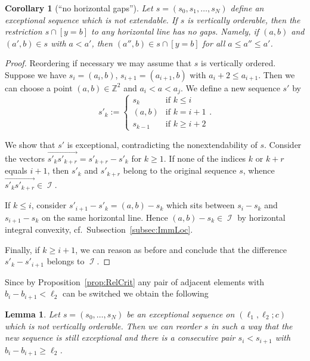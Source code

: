 \documentclass[11pt]{article}
\newtheorem{lemma}[theo]{Lemma}
\newtheorem{coro}[theo]{Corollary}
\theoremstyle{definition}
\numberwithin{equation}{section}
\newcommand{\Z}{\mathbb Z}
\newcommand{\CI}{{\mathcal I}}
\newcommand{\vect}{\overrightarrow}
\newcommand{\nImm}{\operatorname{\CI}}
\newcommand{\cl}{s}
\newcommand{\ssect}[1]{Subsection~\ref{#1}}
\begin{document}
\begin{coro}[``no horizontal gaps'']
\label{coro:NoGaps}
Let $\cl=(\cl_0,\cl_1,\ldots,\cl_N)$ define an
exceptional sequence which is not extendable. 
If $\cl$ is vertically orderable, 
then the restriction $\cl\cap[y=b]$ to any horizontal 
line has no gaps. Namely, if $(a,b)$ and $(a',b)\in\cl$ 
with $a<a'$, then $(a'',b)\in\cl\cap[y=b]$ for all 
$a\leq a''\leq a'$.
\end{coro}

\begin{proof}
Reordering if necessary we may assume 
that $\cl$ is vertically ordered. 
Suppose we have $\cl_i=(a_i,b)$, 
$\cl_{i+1}=(a_{i+1},b)$ with $a_i+2\leq a_{i+1}$. 
Then we can choose a point $(a,b)\in\Z^2$ and $a_i<a<a_j$.
We define a new sequence $\cl'$ by
$$
\cl'_k:=\left\{\begin{array}{ll}
\cl_k & \mbox{if }k\leq i\\
(a,b) & \mbox{if }k=i+1\\
\cl_{k-1} & \mbox{if }k\geq i+2
\end{array}\right..
$$

We show that $\cl'$ is exceptional, contradicting the 
nonextendability of $\cl$. Consider the vectors 
$\vect{\cl'_k\cl'_{k+r}}=\cl'_{k+r}-\cl'_k$ 
for $k\geq 1$. If none of the indices $k$ or $k+r$ 
equals $i+1$, then $\cl'_k$ and $\cl'_{k+r}$ belong to 
the original sequence $\cl$, whence 
$\vect{\cl'_k\cl'_{k+r}}\in\nImm$.

If $k\leq i$, consider $\cl'_{i+1}-\cl'_k=(a,b)-\cl_k$ 
which sits between $\cl_i-\cl_k$ and $\cl_{i+1}-\cl_k$ 
on the same horizontal line. Hence $(a,b)-\cl_k\in\nImm$ 
by horizontal integral convexity, cf.\ 
\ssect{subsec:ImmLoc}.

Finally, if $k\geq i+1$, we can reason as before
and conclude that the difference $\cl'_k-\cl'_{i+1}$ 
belongs to $\nImm$.  
\end{proof}

{Since by Proposition~\ref{prop:RelCrit} any 
pair of adjacent elements with $b_i-b_{i+1}<\ell_2$ can be switched we 
obtain the following}

\begin{lemma}
\label{lem:ReorderJump}
Let $\cl=(\cl_0,\ldots,\cl_N)$ be an 
exceptional sequence on $(\ell_1,\ell_2;c)$ 
which is not vertically orderable. Then we can 
reorder $\cl$ in such a way that the new 
sequence is still exceptional and there is a 
consecutive pair $\cl_i<\cl_{i+1}$ with 
$b_i-b_{i+1}\geq\ell_2$. 
\end{lemma}
\end{document}

